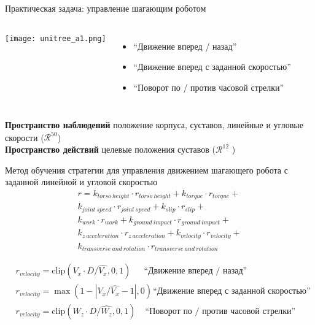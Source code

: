 \begin{frame}{Практическая задача: управление шагающим роботом}
\begin{columns}
\centering
\texttt{[image: unitree\_a1.png]}
\begin{itemize}
    \item ``Движение вперед / назад''
	\item ``Движение вперед с заданной скоростью''
    \item ``Поворот по / против часовой стрелки''
\end{itemize}
\end{columns}
\textbf{Пространство наблюдений} положение корпуса, суставов, линейные и угловые скорости ($\mathcal{R}^{50}$) 
\\
\textbf{Пространство действий} целевые положения суставов ($\mathcal{R}^{12}$ )

\end{frame}

\begin{frame}{Метод обучения стратегии для управления движением
шагающего робота с заданной линейной и угловой скоростью}
\begin{multline*}
    r = k_{torso\ height} \cdot r_{torso\ height} +
    k_{torque} \cdot r_{torque} +\\
    k_{joint\ speed} \cdot r_{joint\ speed} +
    k_{slip} \cdot r_{slip} +\\
    k_{work} \cdot r_{work} + 
    k_{ground\ impact} \cdot r_{ground\ impact} +\\
    k_{z\ acceleration} \cdot r_{z\ acceleration} +  k_{velocity} \cdot r_{velocity} +\\
    k_{transverse\ and\ rotation} \cdot r_{transverse\ and\ rotation}
\label{eq:unitree_reward}
\end{multline*}

\begin{align*}
& r_{velocity} = \mathrm{clip}(V_x \cdot D / \hat{V_x}, 0, 1) \hspace{18pt}\text{``Движение вперед / назад''}\\
& r_{velocity} = \max(1 - |V_x / \hat{V_x} - 1|, 0) \hspace{1pt}\text{``Движение вперед с заданной скоростью''}\\
& r_{velocity} = \mathrm{clip}(W_z \cdot D / \hat{W_z}, 0, 1) \hspace{13pt}\text{``Поворот по / против часовой стрелки''}
\end{align*}
\end{frame}

